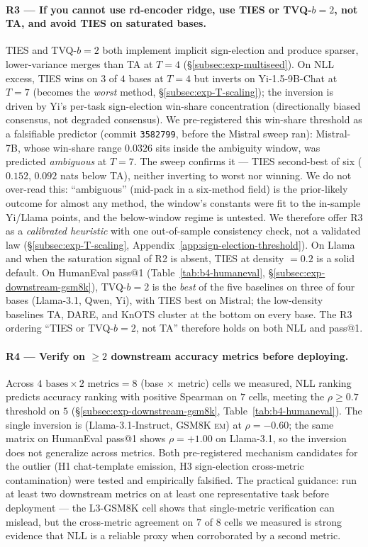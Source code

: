 \paragraph{R3 --- If you cannot use rd-encoder ridge, use TIES or
TVQ-$b{=}2$, not TA, and avoid TIES on saturated bases.}
TIES and TVQ-$b{=}2$ both implement implicit sign-election and produce
sparser, lower-variance merges than TA at $T = 4$
(\S\ref{subsec:exp-multiseed}). On NLL excess, TIES wins on $3$ of $4$
bases at $T = 4$ but inverts on Yi-1.5-9B-Chat at $T = 7$ (becomes the
\emph{worst} method, \S\ref{subsec:exp-T-scaling}); the inversion is
driven by Yi's per-task sign-election win-share concentration
(directionally biased consensus, not degraded consensus). We
pre-registered this win-share threshold as a falsifiable predictor
(commit \texttt{3582799}, before the Mistral sweep ran):
Mistral-7B, whose win-share range $0.0326$ sits inside the ambiguity
window, was predicted \emph{ambiguous} at $T = 7$. The sweep confirms
it --- TIES second-best of six ($0.152$, $0.092$ nats below TA),
neither inverting to worst nor winning. We do not over-read this:
``ambiguous'' (mid-pack in a six-method field) is the prior-likely
outcome for almost any method, the window's constants were fit to the
in-sample Yi/Llama points, and the below-window regime is untested. We
therefore offer R3 as a \emph{calibrated heuristic} with one
out-of-sample consistency check, not a validated law
(\S\ref{subsec:exp-T-scaling}, Appendix~\ref{app:sign-election-threshold}).
On Llama and
when the saturation signal of R2 is absent, TIES at density $= 0.2$ is
a solid default. On HumanEval pass@1
(Table~\ref{tab:b4-humaneval}, \S\ref{subsec:exp-downstream-gsm8k}),
TVQ-$b{=}2$ is the \emph{best} of the five baselines on three of four
bases (Llama-3.1, Qwen, Yi), with TIES best on Mistral; the low-density
baselines TA, DARE, and KnOTS cluster at the bottom on every base. The R3 ordering
``TIES or TVQ-$b{=}2$, not TA'' therefore holds on both NLL and
pass@1.

\paragraph{R4 --- Verify on $\geq 2$ downstream accuracy
metrics before deploying.}
Across $4 \text{ bases} \times 2 \text{ metrics} = 8$
(base $\times$ metric) cells we measured, NLL ranking predicts
accuracy ranking with positive Spearman on $7$ cells, meeting the
$\rho \geq 0.7$ threshold on $5$
(\S\ref{subsec:exp-downstream-gsm8k}, Table~\ref{tab:b4-humaneval}).
The single inversion is (Llama-3.1-Instruct, GSM8K \textsc{em})
at $\rho = -0.60$; the same matrix on HumanEval pass@1
shows $\rho = +1.00$ on Llama-3.1, so the inversion does not
generalize across metrics. Both pre-registered mechanism
candidates for the outlier (H1 chat-template emission, H3
sign-election cross-metric contamination) were tested and
empirically falsified. The practical guidance: run at least
two downstream metrics on at least one representative task
before deployment --- the L3-GSM8K cell shows that
single-metric verification can mislead, but the cross-metric
agreement on $7$ of $8$ cells we measured is strong evidence
that NLL is a reliable proxy when corroborated by a second
metric.

